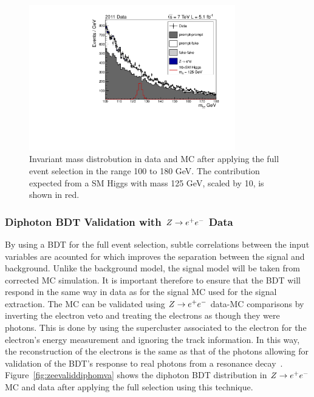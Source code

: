 \begin{figure}[hbt!]
\begin{center}
  \includegraphics[width=0.8\textwidth]{hgg7TeV/variablePlots/mass}
 \caption{Invariant mass distrobution in data and MC after applying the full event selection in the
 range 100 to 180 GeV. The contribution expected from a SM Higgs with mass 125 GeV, scaled by 10, 
 is shown in red. }
 \label{fig:massmcdata}
\end{center}
\end{figure}

\subsubsection{Diphoton BDT Validation with $Z\rightarrow e^{+}e^{-}$ Data}
By using a BDT for the full event selection, subtle correlations between the input variables are acounted for
which improves the separation between the signal and background. 
Unlike the background model, the signal model will be taken from corrected MC simulation. 
It is important therefore to ensure that the BDT will respond in the same way in data as for the signal MC
used for the signal extraction. The MC can be validated using $Z\rightarrow e^{+}e^{-}$ data-MC
comparisons by inverting the electron veto and treating the electrons as though they were photons.
This is done by using the supercluster associated to the electron for the electron's energy measurement 
and ignoring the track information. In this way, the reconstruction of the electrons is the same as that
of the photons allowing for validation of the BDT's response to real photons from a resonance decay~\citep{null}. 
Figure~\ref{fig:zeevaliddiphomva} shows the diphoton BDT distribution in $Z\rightarrow e^{+}e^{-}$ MC and data after applying
the full selection using this technique. 

